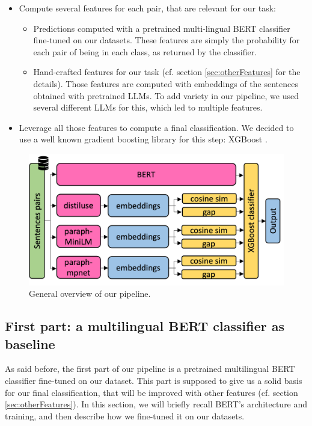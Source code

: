 \documentclass[final]{cvpr}
\begin{document}
\begin{itemize}
    \item Compute several features for each pair, that are relevant for our task:
    \begin{itemize}
        \item Predictions computed with a pretrained multi-lingual BERT classifier \cite{multilingualBert} fine-tuned on our datasets. These features are simply the probability for each pair of being in each class, as returned by the classifier.
        \item Hand-crafted features for our task (cf. section \ref{sec:otherFeatures} for the details). Those features are computed with embeddings of the sentences obtained with pretrained LLMs. To add variety in our pipeline, we used several different LLMs for this, which led to multiple features.
    \end{itemize}
    \item Leverage all those features to compute a final classification. We decided to use a well known gradient boosting library for this step: XGBoost \cite{xgboost}.
\end{itemize}

\begin{figure}[ht]
	\centering
	\includegraphics[width=\columnwidth]{figures/pipeline.png}
	\caption{General overview of our pipeline.}
    \label{pipeline}
\end{figure}

\subsection{First part: a multilingual BERT classifier as baseline} \label{sec:mBert}

As said before, the first part of our pipeline is a pretrained multilingual BERT classifier fine-tuned on our dataset. This part is supposed to give us a solid basis for our final classification, that will be improved with other features (cf. section \ref{sec:otherFeatures}). In this section, we will briefly recall BERT's architecture and training, and then describe how we fine-tuned it on our datasets.
\end{document}
